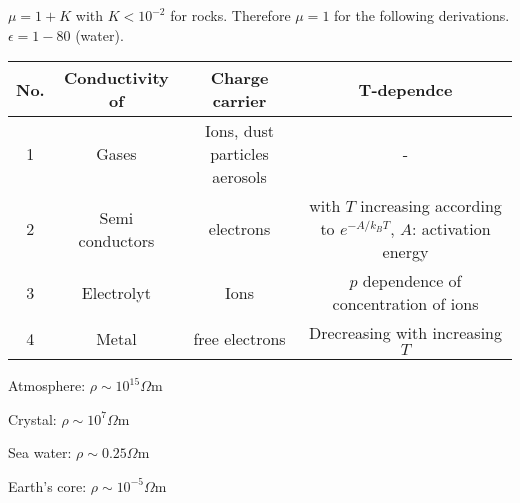 $\mu=1+K$ with $K<10^{-2}$ for rocks. Therefore $\mu=1$ for the following derivations. $\epsilon= 1-80$ (water).

\begin{tabularx}{\textwidth}{c|c|c|c}
No. & Conductivity of & Charge carrier & T-dependce\\
\hline
1 & Gases & Ions, dust particles aerosols & - \\
2 & Semi conductors & electrons & with $T$ increasing according to $e^{-A/k_B T}$, $A$: activation energy\\
3 & Electrolyt & Ions & $p$ dependence of concentration of ions\\
4 & Metal & free electrons & Drecreasing with increasing $T$
\end{tabularx}

\begin{compactenum}[1)]
\item Atmosphere: $\rho\sim 10^{15}\Omega$m
\item Crystal: $\rho\sim 10^{7}\Omega$m
\item Sea water: $\rho\sim 0.25\Omega$m
\item Earth's core: $\rho\sim 10^{-5}\Omega$m
\end{compactenum}


